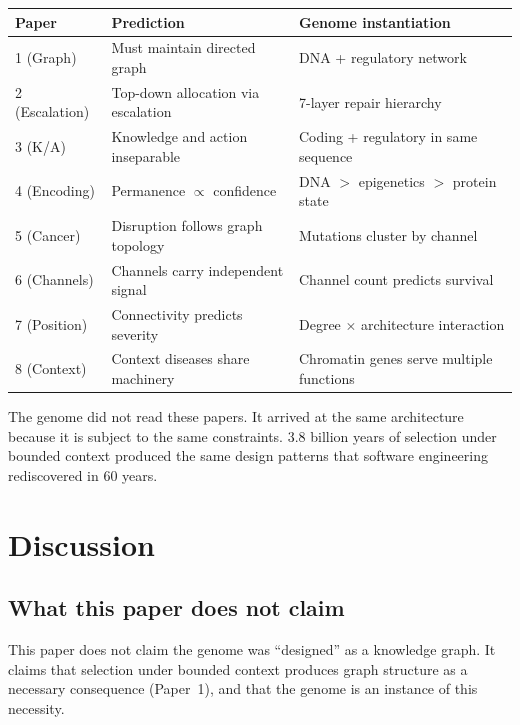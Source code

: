 \documentclass[11pt]{article}
\theoremstyle{definition}
\begin{document}
\begin{center}
\small
\begin{tabular}{lll}
\toprule
\textbf{Paper} & \textbf{Prediction} & \textbf{Genome instantiation} \\
\midrule
1 (Graph) & Must maintain directed graph & DNA + regulatory network \\
2 (Escalation) & Top-down allocation via escalation & 7-layer repair hierarchy \\
3 (K/A) & Knowledge and action inseparable & Coding + regulatory in same sequence \\
4 (Encoding) & Permanence $\propto$ confidence & DNA $>$ epigenetics $>$ protein state \\
\midrule
5 (Cancer) & Disruption follows graph topology & Mutations cluster by channel \\
6 (Channels) & Channels carry independent signal & Channel count predicts survival \\
7 (Position) & Connectivity predicts severity & Degree $\times$ architecture interaction \\
8 (Context) & Context diseases share machinery & Chromatin genes serve multiple functions \\
\bottomrule
\end{tabular}
\end{center}

The genome did not read these papers. It arrived at the same
architecture because it is subject to the same constraints.
3.8 billion years of selection under bounded context produced the
same design patterns that software engineering rediscovered in 60
years.

\section{Discussion}
\label{sec:discussion}

\subsection{What this paper does not claim}

This paper does not claim the genome was ``designed'' as a knowledge
graph. It claims that selection under bounded context produces graph
structure as a necessary consequence (Paper~1), and that the genome
is an instance of this necessity.
\end{document}
